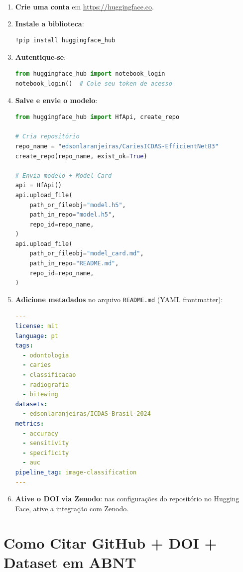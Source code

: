 \begin{enumerate}
  \item \textbf{Crie uma conta} em \url{https://huggingface.co}.
  \item \textbf{Instale a biblioteca}:
\begin{lstlisting}[language=bash]
!pip install huggingface_hub
\end{lstlisting}

  \item \textbf{Autentique-se}:
\begin{lstlisting}[language=Python]
from huggingface_hub import notebook_login
notebook_login()  # Cole seu token de acesso
\end{lstlisting}

  \item \textbf{Salve e envie o modelo}:
\begin{lstlisting}[language=Python]
from huggingface_hub import HfApi, create_repo

# Cria repositório
repo_name = "edsonlaranjeiras/CariesICDAS-EfficientNetB3"
create_repo(repo_name, exist_ok=True)

# Envia modelo + Model Card
api = HfApi()
api.upload_file(
    path_or_fileobj="model.h5",
    path_in_repo="model.h5",
    repo_id=repo_name,
)
api.upload_file(
    path_or_fileobj="model_card.md",
    path_in_repo="README.md",
    repo_id=repo_name,
)
\end{lstlisting}

  \item \textbf{Adicione metadados} no arquivo \texttt{README.md} (YAML
    frontmatter):
\begin{lstlisting}[language=yaml]
---
license: mit
language: pt
tags:
  - odontologia
  - caries
  - classificacao
  - radiografia
  - bitewing
datasets:
  - edsonlaranjeiras/ICDAS-Brasil-2024
metrics:
  - accuracy
  - sensitivity
  - specificity
  - auc
pipeline_tag: image-classification
---
\end{lstlisting}

  \item \textbf{Ative o DOI via Zenodo}: nas configurações do repositório
    no Hugging Face, ative a integração com Zenodo.
\end{enumerate}


\section{Como Citar GitHub + DOI + Dataset em ABNT}

